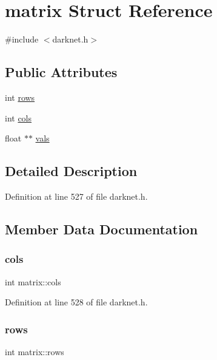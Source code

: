 \hypertarget{structmatrix}{}\section{matrix Struct Reference}
\label{structmatrix}


{\ttfamily \#include $<$darknet.\+h$>$}

\subsection*{Public Attributes}
\begin{DoxyCompactItemize}
\item 
int \mbox{\hyperlink{structmatrix_af83737a5597214de0458c5535a787143}{rows}}
\item 
int \mbox{\hyperlink{structmatrix_a8a250fb537afd000561485dd88281356}{cols}}
\item 
float $\ast$$\ast$ \mbox{\hyperlink{structmatrix_ac06cdc346e87ea5cb4e4ae1a9b91d61f}{vals}}
\end{DoxyCompactItemize}


\subsection{Detailed Description}


Definition at line 527 of file darknet.\+h.



\subsection{Member Data Documentation}
\mbox{\label{structmatrix_a8a250fb537afd000561485dd88281356}} 
\subsubsection{\texorpdfstring{cols}{cols}}
{\footnotesize\ttfamily int matrix\+::cols}



Definition at line 528 of file darknet.\+h.

\mbox{\label{structmatrix_af83737a5597214de0458c5535a787143}} 
\subsubsection{\texorpdfstring{rows}{rows}}
{\footnotesize\ttfamily int matrix\+::rows}



